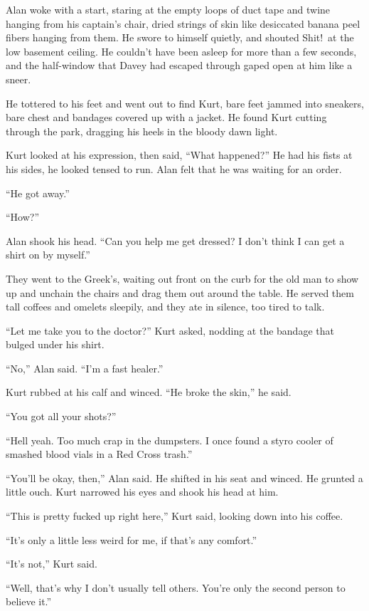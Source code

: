 Alan woke with a start, staring at the empty loops of duct tape and
twine hanging from his captain's chair, dried strings of skin like
desiccated banana peel fibers hanging from them.  He swore to himself
quietly, and shouted Shit!\ at the low basement ceiling.  He couldn't
have been asleep for more than a few seconds, and the half-window that
Davey had escaped through gaped open at him like a sneer.

He tottered to his feet and went out to find Kurt, bare feet jammed
into sneakers, bare chest and bandages covered up with a jacket.  He
found Kurt cutting through the park, dragging his heels in the bloody
dawn light.

Kurt looked at his expression, then said, ``What happened?'' He had
his fists at his sides, he looked tensed to run.  Alan felt that he
was waiting for an order.

``He got away.''

``How?''

Alan shook his head.  ``Can you help me get dressed?  I don't think I
can get a shirt on by myself.''

They went to the Greek's, waiting out front on the curb for the old
man to show up and unchain the chairs and drag them out around the
table.  He served them tall coffees and omelets sleepily, and they ate
in silence, too tired to talk.

``Let me take you to the doctor?'' Kurt asked, nodding at the bandage
that bulged under his shirt.

``No,'' Alan said.  ``I'm a fast healer.''

Kurt rubbed at his calf and winced.  ``He broke the skin,'' he said.

``You got all your shots?''

``Hell yeah.  Too much crap in the dumpsters.  I once found a styro
cooler of smashed blood vials in a Red Cross trash.''

``You'll be okay, then,'' Alan said.  He shifted in his seat and
winced.  He grunted a little ouch.  Kurt narrowed his eyes and shook
his head at him.

``This is pretty fucked up right here,'' Kurt said, looking down into
his coffee.

``It's only a little less weird for me, if that's any comfort.''

``It's not,'' Kurt said.

``Well, that's why I don't usually tell others.  You're only the
second person to believe it.''

